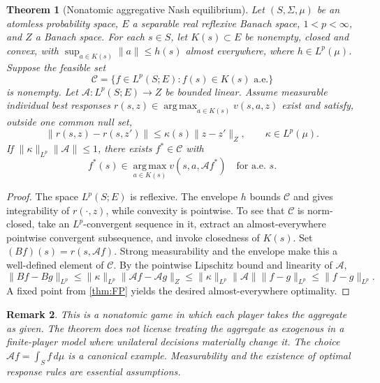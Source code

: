 \documentclass[11pt]{article}
\newtheorem{theorem}{Theorem}[section]
\newtheorem{remark}[theorem]{Remark}
\theoremstyle{definition}\newtheorem{definition}[theorem]{Definition}
\newcommand{\argmax}{\operatorname*{arg\,max}}
\begin{document}
\begin{theorem}[Nonatomic aggregative Nash equilibrium\label{thm:nonatomic}]
Let $(S,\Sigma,\mu)$ be an atomless probability space, $E$ a separable real reflexive Banach space, $1<p<\infty$, and $Z$ a Banach space. For each $s\in S$, let $K(s)\subset E$ be nonempty, closed and convex, with $\sup_{a\in K(s)}\|a\|\le h(s)$ almost everywhere, where $h\in L^p(\mu)$. Suppose the feasible set
\[\mathcal C=\{f\in L^p(S;E):f(s)\in K(s)\text{ a.e.}\}\]
is nonempty. Let $\mathcal A:L^p(S;E)\to Z$ be bounded linear. Assume measurable individual best responses $r(s,z)\in\argmax_{a\in K(s)}v(s,a,z)$ exist and satisfy, outside one common null set,
\[\|r(s,z)-r(s,z')\|\le\kappa(s)\|z-z'\|_Z,\qquad \kappa\in L^p(\mu).\]
If $\|\kappa\|_{L^p}\|\mathcal A\|\le1$, there exists $f^*\in\mathcal C$ with
\[f^*(s)\in\argmax_{a\in K(s)}v(s,a,\mathcal Af^*)\quad\text{for a.e. }s.\]
\end{theorem}
\begin{proof}
The space $L^p(S;E)$ is reflexive. The envelope $h$ bounds $\mathcal C$ and gives integrability of $r(\cdot,z)$, while convexity is pointwise. To see that $\mathcal C$ is norm-closed, take an $L^p$-convergent sequence in it, extract an almost-everywhere pointwise convergent subsequence, and invoke closedness of $K(s)$. Set $(Bf)(s)=r(s,\mathcal Af)$. Strong measurability and the envelope make this a well-defined element of $\mathcal C$. By the pointwise Lipschitz bound and linearity of $\mathcal A$,
\[\|Bf-Bg\|_{L^p}\le\|\kappa\|_{L^p}\|\mathcal Af-\mathcal Ag\|_Z
\le\|\kappa\|_{L^p}\|\mathcal A\|\|f-g\|_{L^p}\le\|f-g\|_{L^p}.\]
A fixed point from \cref{thm:FP} yields the desired almost-everywhere optimality.
\end{proof}
\begin{remark}
This is a nonatomic game in which each player takes the aggregate as given. The theorem does not license treating the aggregate as exogenous in a finite-player model where unilateral decisions materially change it. The choice $\mathcal Af=\int_Sf\,d\mu$ is a canonical example. Measurability and the existence of optimal response rules are essential assumptions.
\end{remark}
\end{document}
